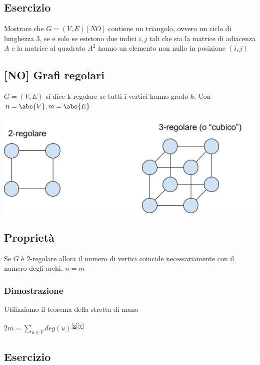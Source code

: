 \documentclass{article}
\begin{document}
{{{\subsection{Esercizio}

{Mostrare che $G=(V,E) [NO]$ contiene un triangolo, ovvero un ciclo di lunghezza 3, se e solo se esistono due indici $i,j$ tali che sia la matrice di adiacenza $A$ e la matrice al quadrato $A^2$ hanno un elemento non nullo in posizione $(i,j)$}

\hypertarget{h.m8b6lpkoqj6x}{\subsection{\texorpdfstring{{{[}NO{]} Grafi regolari}}{{[}NO{]} Grafi regolari}}\label{h.m8b6lpkoqj6x}}

{$G=(V,E)$ si dice k-regolare se tutti i vertici hanno grado $k$. Con $n=\abs{V},m=\abs{E}$}

{\includegraphics{images/image524.png}}

\subsection{Proprietà}

{Se $G$ è 2-regolare allora il numero di vertici coincide necessariamente con il numero degli archi. $n=m$}

\subsubsection{Dimostrazione}

{Utilizziamo il teorema della stretta di mano}

$2m=\sum_{u\in V}{deg(u)}$\textsuperscript{\protect\hyperlink{cmnt24}{{[}x{]}}\protect\hyperlink{cmnt25}{{[}y{]}}}

\subsection{Esercizio}

}}}
\end{document}

